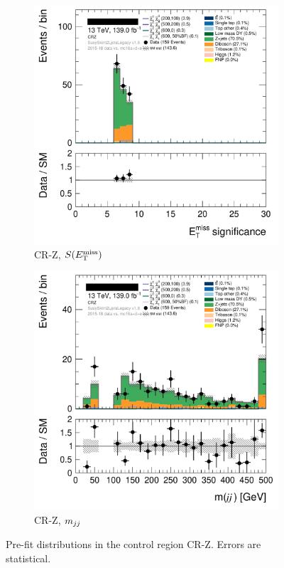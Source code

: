 \begin{figure}[tp]
\centering
\begin{subfigure}{0.48\textwidth}
\centering
\includegraphics[width=\textwidth]{figures/2ljets_def_met_Sign_CRZ.png}
\caption{CR-Z, $S(E_\mathrm{T}^\mathrm{miss})$}
\end{subfigure}
\hfill
\begin{subfigure}{0.48\textwidth}
\centering
\includegraphics[width=\textwidth]{figures/2ljets_def_mjj_CRZ.png}
\caption{CR-Z, $m_{jj}$}
\end{subfigure}
\caption[
Pre-fit distributions in the control region CR-Z
]{%
Pre-fit distributions in the control region CR-Z.
Errors are statistical.
}
\label{fig:2ljets_low_cr_region}
\end{figure}

